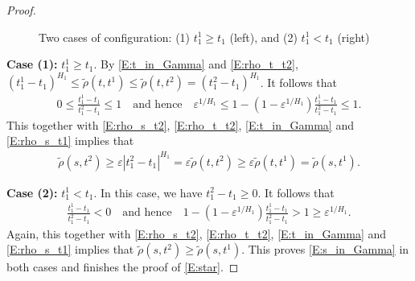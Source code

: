 \documentclass[11pt, reqno]{amsart}
\numberwithin{equation}{section}
\begin{document}
\begin{proof}
\begin{figure}
\qquad
{}
\caption{Two cases of configuration: (1) $t_1^1 \ge t_1$ (left), and (2) $t^1_1 < t_1$ (right)}\label{fig1}
\end{figure}

{\bf Case (1):} $t_1^1 \ge t_1$. 
By \eqref{E:t_in_Gamma} and \eqref{E:rho_t_t2}, $(t^1_1-t_1)^{H_1} \le \tilde\rho(t, t^1) \le \tilde\rho(t, t^2) = (t^2_1-t_1)^{H_1}$.
It follows that
\begin{align*}
0 \le \frac{t^1_1-t_1}{t^2_1-t_1} \le 1 \quad \text{and hence} \quad
\varepsilon^{1/H_1} \le 1 - (1-\varepsilon^{1/H_1}) \frac{t^1_1-t_1}{t^2_1-t_1} \le 1.
\end{align*}
This together with \eqref{E:rho_s_t2}, \eqref{E:rho_t_t2}, \eqref{E:t_in_Gamma} and \eqref{E:rho_s_t1} implies that
\begin{align*}
\tilde\rho(s, t^2) \ge \varepsilon|t^2_1-t_1|^{H_1} = \varepsilon\tilde\rho(t, t^2) 
\ge \varepsilon\tilde\rho(t, t^1) = \tilde\rho(s, t^1).
\end{align*}

{\bf Case (2):} $t^1_1 < t_1$. In this case, we have $t^2_1 - t_1 \ge 0$. It follows that
\begin{align*}
\frac{t^1_1-t_1}{t^2_1-t_1} < 0 \quad \text{and hence}  \quad
1 - (1-\varepsilon^{1/H_1}) \frac{t^1_1-t_1}{t^2_1-t_1} > 1 \ge \varepsilon^{1/H_1}.
\end{align*}
Again, this together with \eqref{E:rho_s_t2}, \eqref{E:rho_t_t2}, \eqref{E:t_in_Gamma} and \eqref{E:rho_s_t1} 
implies that $\tilde\rho(s, t^2) \ge \tilde\rho(s, t^1)$. This proves \eqref{E:s_in_Gamma} in both cases and finishes 
the proof of \eqref{E:star}.
\end{proof}
\end{document}
